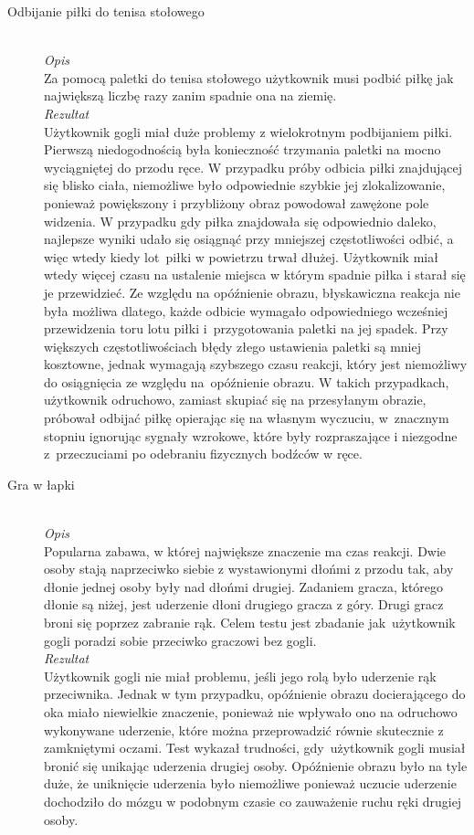 \documentclass[a4paper,11pt,twoside]{report}
\theoremstyle{definition}
\begin{document}
\begin{description}
\item[Odbijanie piłki do tenisa stołowego] \hfill \\
\textit{Opis} \\
 Za pomocą paletki do tenisa stołowego użytkownik musi podbić piłkę jak największą liczbę razy zanim spadnie ona na ziemię. \\
 
\textit{Rezultat}\\
Użytkownik gogli miał duże problemy z wielokrotnym podbijaniem piłki. Pierwszą niedogodnością była konieczność trzymania paletki na mocno wyciągniętej do przodu ręce. W przypadku próby odbicia piłki znajdującej się blisko ciała,  niemożliwe było odpowiednie szybkie jej zlokalizowanie, ponieważ powiększony i przybliżony obraz powodował zawężone pole widzenia. W przypadku gdy piłka znajdowała się odpowiednio daleko, najlepsze wyniki udało się osiągnąć przy mniejszej częstotliwości odbić, a więc wtedy kiedy lot~piłki w powietrzu trwał dłużej. Użytkownik miał wtedy więcej czasu na ustalenie miejsca w którym spadnie piłka i starał się je przewidzieć. Ze względu na opóźnienie obrazu, błyskawiczna reakcja nie była możliwa dlatego, każde odbicie wymagało odpowiedniego wcześniej przewidzenia toru lotu piłki i~przygotowania paletki na jej spadek. Przy większych częstotliwościach błędy złego ustawienia paletki są mniej kosztowne, jednak wymagają szybszego czasu reakcji, który jest niemożliwy do osiągnięcia ze względu na~opóźnienie obrazu. W takich przypadkach, użytkownik odruchowo, zamiast skupiać się na przesyłanym obrazie, próbował odbijać piłkę opierając się na własnym wyczuciu, w~znacznym stopniu ignorując sygnały wzrokowe, które były rozpraszające i niezgodne z~przeczuciami po odebraniu fizycznych bodźców w ręce. 

\item[Gra w łapki] \hfill \\
\textit{Opis} \\
Popularna zabawa, w której największe znaczenie ma czas reakcji. Dwie osoby stają naprzeciwko siebie z wystawionymi dłońmi z przodu tak, aby dłonie jednej osoby były nad dłońmi drugiej. Zadaniem gracza, którego dłonie są niżej, jest uderzenie dłoni drugiego gracza z góry. Drugi gracz broni się poprzez zabranie rąk. Celem testu jest zbadanie jak~użytkownik gogli poradzi sobie przeciwko graczowi bez gogli. \\

\textit{Rezultat}\\
Użytkownik gogli nie miał problemu, jeśli jego rolą było uderzenie rąk przeciwnika. Jednak w tym przypadku, opóźnienie obrazu docierającego do oka miało niewielkie znaczenie, ponieważ nie wpływało ono na odruchowo wykonywane uderzenie, które można przeprowadzić równie skutecznie z zamkniętymi oczami. Test wykazał trudności, gdy~użytkownik gogli musiał bronić się unikając uderzenia drugiej osoby. Opóźnienie obrazu było na tyle duże, że uniknięcie uderzenia było niemożliwe ponieważ uczucie uderzenie dochodziło do mózgu w podobnym czasie co zauważenie ruchu ręki drugiej osoby.


\end{description}
\end{document}
